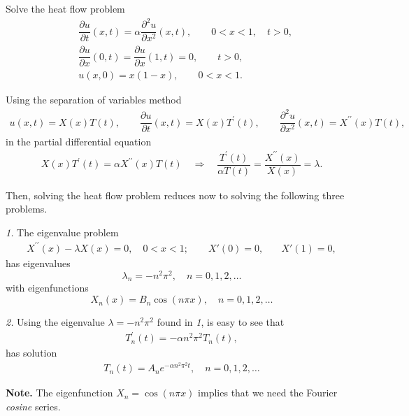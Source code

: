 \documentclass[11pt]{article}
\begin{document}
\begin{problem}
Solve the heat flow problem
\begin{equation*} \begin{split}
& \dfrac{\partial u }{\partial t } (x,t) = \alpha \dfrac{\partial^2 u}{\partial x^2}(x,t), \qquad 0<x<1, \quad t>0, \\
& \dfrac{\partial u }{\partial x } (0,t) = \dfrac{\partial u }{\partial x } (1,t)=0, \qquad t>0, \\
& u(x,0) = x(1-x), \qquad 0<x<1.
\end{split}\end{equation*}
\end{problem}

\begin{solution}
Using the separation of variables method
\begin{eqnarray*}
u(x,t) = X(x)T(t), \qquad
\dfrac{\partial u }{\partial t }(x,t) = X(x)T^{\prime}(t), \qquad
\dfrac{\partial^2 u}{\partial x^2}(x,t) = X^{\prime \prime}(x)T(t),
\end{eqnarray*}
in the partial differential equation
\begin{eqnarray*}
X(x)T^{\prime}(t) = \alpha X^{\prime \prime}(x)T(t) \quad 
\Rightarrow \quad \dfrac{T^{\prime}(t)}{\alpha T(t)} = \dfrac{X^{\prime \prime}(x)}{X(x)} = \lambda.
\end{eqnarray*}

Then, solving the heat flow problem reduces now to solving the following three problems.

\textsl{1.} The eigenvalue problem
\begin{eqnarray*}
X^{\prime \prime}(x) - \lambda X(x) =0, \quad 0<x<1; \qquad
X'(0)=0, \quad & X'(1) =0,
\end{eqnarray*}
has eigenvalues 
$$\lambda_{n} = -n^2\pi^{2}, \quad n = 0,1,2 , \dots$$ 
with eigenfunctions 
$$\boxed{X_{n}(x) = B_{n}\cos(n\pi x)},\quad n = 0,1,2 , \dots$$


\textsl{2. } Using the eigenvalue $\lambda = -n^2\pi^{2}$ found in \textsl{1}, is easy to see that 
\begin{eqnarray*}
T_{n}^{\prime}(t) = - \alpha n^{2}\pi^{2} T_{n}(t),
\end{eqnarray*}
has solution
\begin{eqnarray*}
\boxed{T_{n}(t) = A_{n}e^{-\alpha n^{2}\pi^{2} t}},\quad n = 0,1,2 , \dots
\end{eqnarray*}

\textbf{Note.} The eigenfunction $X_{n}=\cos(n\pi x)$ implies that we need the Fourier \textsl{cosine} series.


\end{solution}
\end{document}
